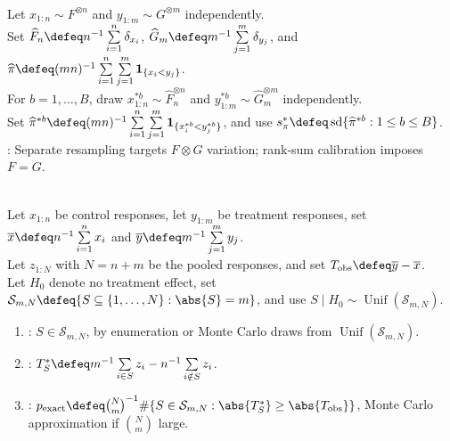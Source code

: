 \begin{example} \label{ex:bootstrap-mann-whitney-effect} \\
Let $x_{1:n}\sim F^{\otimes n}$ and $y_{1:m}\sim G^{\otimes m}$ independently.\\
Set $\widehat{F}_n\defeq n^{-1}\sum\limits_{i=1}^{n}\delta_{x_i}$, $\widehat{G}_m\defeq m^{-1}\sum\limits_{j=1}^{m}\delta_{y_j}$, and $\widehat{\pi}\defeq(mn)^{-1}\sum\limits_{i=1}^{n}\sum\limits_{j=1}^{m}\mathbf{1}_{\{x_i<y_j\}}$.\\
For $b=1,\ldots,B$, draw $x_{1:n}^{\ast b}\sim\widehat{F}_n^{\otimes n}$ and $y_{1:m}^{\ast b}\sim\widehat{G}_m^{\otimes m}$ independently.\\
Set $\widehat{\pi}^{\ast b}\defeq(mn)^{-1}\sum\limits_{i=1}^{n}\sum\limits_{j=1}^{m}\mathbf{1}_{\{x_i^{\ast b}<y_j^{\ast b}\}}$, and use $s_\pi^\ast\defeq\operatorname{sd}\{\widehat{\pi}^{\ast b}:1\leq b\leq B\}$.\\
: Separate resampling targets $F\otimes G$ variation; rank-sum calibration imposes $F=G$.
\end{example}

\begin{method} \label{meth:two-sample-permutation-mean-test} \\
Let $x_{1:n}$ be control responses, let $y_{1:m}$ be treatment responses, set $\overline{x}\defeq n^{-1}\sum\limits_{i=1}^{n}x_i$ and $\overline{y}\defeq m^{-1}\sum\limits_{j=1}^{m}y_j$.\\
Let $z_{1:N}$ with $N=n+m$ be the pooled responses, and set $T_{\mathrm{obs}}\defeq \overline{y}-\overline{x}$.\\
Let $H_0$ denote no treatment effect, set $\mathcal{S}_{m,N}\defeq\{S\subseteq\{1,\ldots,N\}:\abs{S}=m\}$, and use $S\mid H_0\sim\operatorname{Unif}(\mathcal{S}_{m,N})$.
\begin{enumerate}[label=(\roman*)]
\setlength{\itemsep}{0pt}
\item {}: $S\in\mathcal{S}_{m,N}$, by enumeration or Monte Carlo draws from $\operatorname{Unif}(\mathcal{S}_{m,N})$.
\item {}: $T_S^\ast\defeq m^{-1}\sum\limits_{i\in S}z_i-n^{-1}\sum\limits_{i\notin S}z_i$.
\item {}: $p_{\mathrm{exact}}\defeq\binom{N}{m}^{-1}\#\{S\in\mathcal{S}_{m,N}:\abs{T_S^\ast}\geq\abs{T_{\mathrm{obs}}}\}$, Monte Carlo approximation if $\binom{N}{m}$ large.
\end{enumerate}
\end{method}

